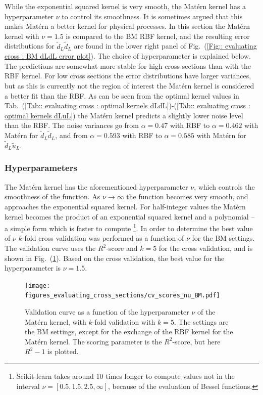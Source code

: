 \documentclass[twoside,english]{uiofysmaster}
\begin{document}
While the exponential squared kernel is very smooth, the Mat\'{e}rn kernel has a hyperparameter $\nu$ to control its smoothness. It is sometimes argued that this makes Mat\'{e}rn a better kernel for physical processes. In this section the Mat\'{e}rn kernel with $\nu=1.5$ is compared to the BM RBF kernel, and the resulting error distributions for $\tilde{d}_L \tilde{d}_L$ are found in the lower right panel of Fig.\ (\ref{Fig:: evaluating cross : BM dLdL error plot}). The choice of hyperparameter is explained below. The predictions are somewhat more stable for high cross sections than with the RBF kernel. For low cross sections the error distributions have larger variances, but as this is currently not the region of interest the Mat\'{e}rn kernel is considered a better fit than the RBF. As can be seen from the optimal kernel values in Tab.\ (\ref{Tab:: evaluating cross : optimal kernels dLdL})-(\ref{Tab:: evaluating cross : optimal kernels dLuL}) the Mat\'{e}rn kernel predicts a slightly lower noise level than the RBF. The noise variances go from $\alpha = 0.47$ with RBF to $\alpha = 0.462$ with Mat\'{e}rn for $\tilde{d}_L \tilde{d}_L$, and from $\alpha = 0.593$ with RBF to $\alpha = 0.585$ with Mat\'{e}rn for $\tilde{d}_L \tilde{u}_L$. 

\subsubsection{Hyperparameters}

The Mat\'{e}rn kernel has the aforementioned hyperparameter $\nu$, which controls the smoothness of the function. As $\nu \rightarrow \infty$ the function becomes very smooth, and approaches the exponential squared kernel. For half-integer values the Mat\'{e}rn kernel becomes the product of an exponential squared kernel and a polynomial -- a simple form which is faster to compute \footnote{Scikit-learn takes around 10 times longer to compute values not in the interval $\nu = [0.5, 1.5, 2.5, \infty]$, because of the evaluation of Bessel functions.}. In order to determine the best value of $\nu$ $k$-fold cross validation was performed as a function of $\nu$ for the BM settings. The validation curve uses the $R^2$-score and $k=5$ for the cross validation, and is shown in Fig.\ (\ref{Fig:: evaluating cross : validation curve nu BM}). Based on the cross validation, the best value for the hyperparameter is $\nu = 1.5$. 


\begin{figure}
\centering
\texttt{[image: figures\_evaluating\_cross\_sections/cv\_scores\_nu\_BM.pdf]}
\caption{Validation curve as a function of the hyperparameter $\nu$ of the Mat\'{e}rn kernel, with $k$-fold validation with $k=5$. The settings are the BM settings, except for the exchange of the RBF kernel for the Mat\'{e}rn kernel. The scoring parameter is the $R^2$-score, but here $R^2-1$ is plotted.}
\label{Fig:: evaluating cross : validation curve nu BM}
\end{figure}
\end{document}
